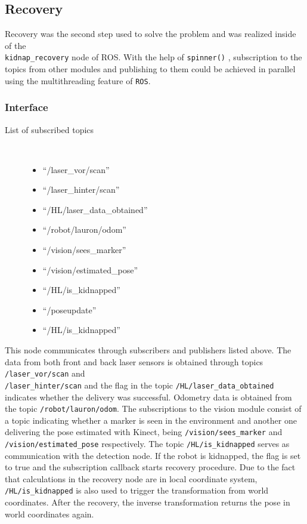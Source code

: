 \subsection{Recovery}
Recovery was the second step used to solve the problem and was realized inside of the
\\
\texttt{kidnap\_recovery} node of ROS. With the help of \texttt{spinner()} , subscription to the topics from other modules and publishing to them could be achieved in parallel using the multithreading feature of \texttt{ROS}. 

\subsubsection{Interface}
\begin{description}
\item[List of subscribed topics]\
	\begin{itemize}
	\item ``/laser\_vor/scan'' 
	\item ``/laser\_hinter/scan'' 
	\item ``/HL/laser\_data\_obtained''
	\item ``/robot/lauron/odom''
	\item ``/vision/sees\_marker'' 
	\item ``/vision/estimated\_pose'' 
	\item ``/HL/is\_kidnapped'' 
	\item ``/poseupdate'' 
	\item ``/HL/is\_kidnapped'' 
	\end{itemize}
\end{description}	
	
This node communicates through subscribers and publishers listed above. The data from both front and back laser sensors is obtained through topics \texttt{/laser\_vor/scan} and
\\
\texttt{/laser\_hinter/scan} and the flag in the topic \texttt{/HL/laser\_data\_obtained} indicates whether the delivery was successful. Odometry data is obtained from the topic \texttt{/robot/lauron/odom}. The subscriptions to the vision module consist of a topic indicating whether a marker is seen in the environment and another one delivering the pose estimated with Kinect, being \texttt{/vision/sees\_marker} and \texttt{/vision/estimated\_pose} respectively. The topic \texttt{/HL/is\_kidnapped} serves as communication with the detection node. If the robot is kidnapped, the flag is set to true and the subscription callback starts recovery procedure. Due to the fact that calculations in the recovery node are in local coordinate system, \texttt{/HL/is\_kidnapped} is also used to trigger the transformation from world coordinates. After the recovery, the inverse transformation returns the pose in world coordinates again.

